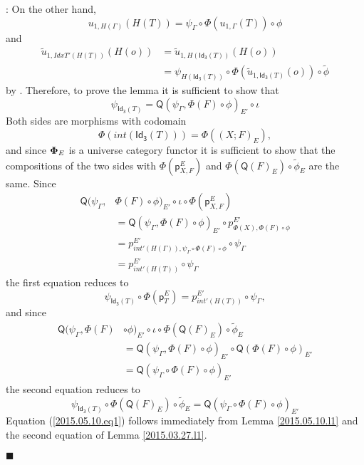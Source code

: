\documentclass[12pt]{article}
\numberwithin{equation}{section}
\newenvironment{eq}{\begin{equation}}{\end{equation}}
\newenvironment{myproof}{{\bf Proof}:}{$\blacksquare$ \vskip 5mm }
\newcommand{\wt}{\widetilde}
\newcommand{\p}{\mathsf{p}}
\newcommand{\Idx}{\mathsf{Id_3}} %
\newcommand{\Q}{\mathsf{Q}}
\begin{document}
\begin{myproof}
On the other hand,
%
$$u_{1,H(\Gamma)}(H(T))=\psi_{\Gamma}\circ \Phi(u_{1,\Gamma}(T))\circ \phi$$
and
\begin{align*}
  \wt{u}_{1,IdxT'(H(T))}(H(o))
    & = \wt{u}_{1,H(\Idx(T))}(H(o)) \\
    & = \psi_{H(\Idx(T))}\circ \Phi(\wt{u}_{1,\Idx(T)}(o))\circ \wt{\phi}
\end{align*}
%
by \cite[Lemma 6.1(1,2)]{fromunivwithPi}. Therefore, to prove the lemma it is
sufficient to show that
%
$$\psi_{\Idx(T)}=\Q(\psi_{\Gamma},\Phi(F)\circ\phi)_{E'}\circ\iota$$
%
Both sides are morphisms with codomain
%
$$\Phi(int(\Idx(T)))=\Phi((X;F)_E),$$
%
and since ${\bf\Phi}_E$ is a universe category functor it is sufficient to show
that the compositions of the two sides with $\Phi(\p^E_{X,F})$ and
$\Phi(\Q(F)_E)\circ \wt{\phi}_E$ are the same. Since
%
\begin{align*}
  \Q(\psi_{\Gamma},&\Phi(F)\circ\phi)_{E'}\circ\iota\circ \Phi(\p^E_{X,F}) \\
    & = \Q(\psi_{\Gamma},\Phi(F)\circ\phi)_{E'}\circ p^{E'}_{\Phi(X),\Phi(F)\circ\phi} \\
    & = p^{E'}_{int'(H(\Gamma)),\psi_{\Gamma}\circ \Phi(F)\circ\phi}\circ\psi_{\Gamma} \\
    & = p^{E'}_{int'(H(T))}\circ\psi_{\Gamma}
\end{align*}
%
the first equation reduces to
%
\begin{eq}
\label{2015.05.10.eq1} \psi_{\Idx(T)}\circ
\Phi(\p^E_{T})=p^{E'}_{int'(H(T))}\circ\psi_{\Gamma},
\end{eq}%
%
and since
%
\begin{align*}
  \Q(\psi_{\Gamma},\Phi(F)&\circ\phi)_{E'}\circ\iota\circ \Phi(\Q(F)_E)\circ \wt{\phi}_E \\
    & = \Q(\psi_{\Gamma},\Phi(F)\circ\phi)_{E'}\circ \Q(\Phi(F)\circ\phi)_{E'} \\
    & = \Q(\psi_{\Gamma}\circ \Phi(F)\circ \phi)_{E'}
\end{align*}
%
the second equation reduces to
%
\begin{eq}
\label{2015.05.10.eq2.0} \psi_{\Idx(T)}\circ \Phi(\Q(F)_E)\circ
\wt{\phi}_E=\Q(\psi_{\Gamma}\circ \Phi(F)\circ \phi)_{E'}
\end{eq}%
%
Equation (\ref{2015.05.10.eq1}) follows immediately from Lemma
\ref{2015.05.10.l1} and the second equation of Lemma \ref{2015.03.27.l1}.


\end{myproof}
\end{document}
